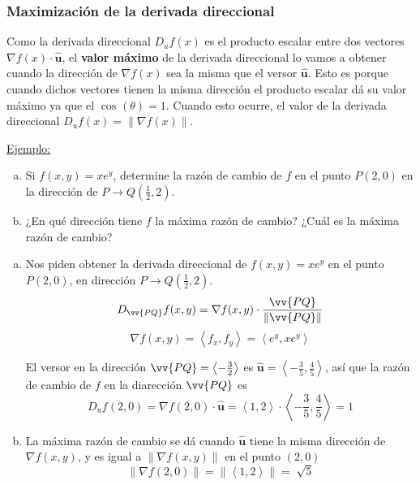 \documentclass[12pt]{article}
\begin{document}
\subsubsection{Maximización de la derivada direccional}
Como la derivada direccional $ D_{u}f(x) $ es el producto escalar entre dos vectores $ \nabla f(x) \cdot \mathbf{\hat{u}} $, el \textbf{valor máximo} de la derivada direccional lo vamos a obtener cuando la dirección de $ \nabla f(x) $ sea la misma que el versor $ \mathbf{\hat{u}} $. Esto es porque cuando dichos vectores tienen la misma dirección el producto escalar dá su valor máximo ya que el $ \cos^{}(\theta)=1 $. Cuando esto ocurre, el valor de la derivada direccional $ D_{u}f(x) = \lVert\nabla f(x)\rVert $.

\underline{Ejemplo:}

\begin{enumerate}[a)]
  \item Si $ f(x,y)=xe^y $, determine la razón de cambio de $ f $ en el punto $ P(2,0) $ en la dirección de $ P  \to Q(\frac{1}{2},2) $.

  \item ¿En qué dirección tiene $ f $ la máxima razón de cambio? ¿Cuál es la máxima razón de cambio?
\end{enumerate}

\begin{enumerate}[a)]
	\item Nos piden obtener la derivada direccional de $ f(x,y)=xe^y $ en el punto $ P(2,0) $, en dirección $ P \to Q(\frac{1}{2},2) $.
		\[
			D_{\vv{PQ}}f(x,y) = \nabla f(x,y) \cdot \frac{\vv{PQ}}{\lVert\vv{PQ}\rVert}
		\]
		\[
			\nabla f(x,y) = \left\langle f_{x},f_{y} \right\rangle = \left\langle e^y,xe^y \right\rangle
		\]
		
	El versor en la dirección $ \vv{PQ}=\left\langle -\frac{3}{2} \right\rangle $ es $ \mathbf{\hat{u}}=\left\langle -\frac{3}{5},\frac{4}{5} \right\rangle $, así que la razón de cambio de $ f $ en la diarección $ \vv{PQ} $ es
	\[
	D_{u}f(2,0)=\nabla f(2,0)\cdot \mathbf{\hat{u}} = \left\langle 1,2 \right\rangle \cdot \left\langle -\frac{3}{5},\frac{4}{5} \right\rangle = 1
	\]

\item La máxima razón de cambio se dá cuando $ \mathbf{\hat{u}} $ tiene la misma dirección de $ \nabla f(x,y) $, y es igual a $ \lVert\nabla f(x,y)\rVert $ en el punto $ (2,0) $
	\[
	\lVert\nabla f(2,0)\rVert = \lVert\left\langle 1,2 \right\rangle\rVert = \sqrt[]{5}
	\]
\end{enumerate}
\end{document}
